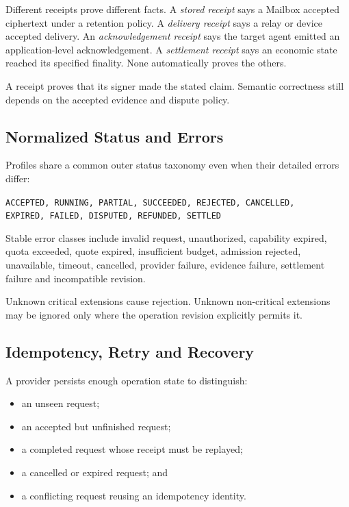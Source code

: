 \documentclass[11pt,oneside]{article}
\begin{document}
Different receipts prove different facts. A \emph{stored receipt} says a Mailbox accepted
ciphertext under a retention policy. A \emph{delivery receipt} says a relay or device accepted
delivery. An \emph{acknowledgement receipt} says the target agent emitted an application-level
acknowledgement. A \emph{settlement receipt} says an economic state reached its specified
finality. None automatically proves the others.

A receipt proves that its signer made the stated claim. Semantic correctness still depends on
the accepted evidence and dispute policy.

\subsection{Normalized Status and Errors}

Profiles share a common outer status taxonomy even when their detailed errors differ:

\begin{center}
\texttt{ACCEPTED, RUNNING, PARTIAL, SUCCEEDED, REJECTED, CANCELLED,}\\
\texttt{EXPIRED, FAILED, DISPUTED, REFUNDED, SETTLED}
\end{center}

Stable error classes include invalid request, unauthorized, capability expired, quota
exceeded, quote expired, insufficient budget, admission rejected, unavailable, timeout,
cancelled, provider failure, evidence failure, settlement failure and incompatible revision.

Unknown critical extensions cause rejection. Unknown non-critical extensions may be ignored
only where the operation revision explicitly permits it.

\subsection{Idempotency, Retry and Recovery}

A provider persists enough operation state to distinguish:

\begin{itemize}
  \item an unseen request;
  \item an accepted but unfinished request;
  \item a completed request whose receipt must be replayed;
  \item a cancelled or expired request; and
  \item a conflicting request reusing an idempotency identity.
\end{itemize}
\end{document}
